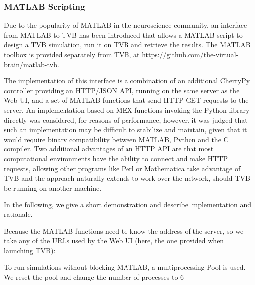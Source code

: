 
\subsubsection{MATLAB Scripting}

Due to the popularity of MATLAB in the neuroscience community, an
interface from MATLAB to TVB has been introduced that allows a MATLAB
script to design a TVB simulation, run it on TVB and retrieve the 
results. The MATLAB toolbox is provided separately from TVB, at
\url{https://github.com/the-virtual-brain/matlab-tvb}.

The implementation of this interface is a combination of an additional
CherryPy controller providing an HTTP/JSON API, running on the same 
server as the Web UI, and a set of MATLAB functions that send HTTP 
GET requests to the server. An implementation based on MEX functions 
invoking the Python library directly was considered, for reasons of 
performance, however, it was judged that such an implementation may be
difficult to stabilize and maintain, given that it would require binary
compatibility between MATLAB, Python and the C compiler. Two additional 
advantages of an HTTP API are that most computational environments have
the ability to connect and make HTTP requests, allowing other programs 
like Perl or Mathematica take advantage of TVB and the approach naturally
extends to work over the network, should TVB be running on another machine.

In the following, we give a short demonstration and 
describe implementation and rationale.



Because the MATLAB functions need to know the address of the server,
so we take any of the URLs used by the Web UI (here, the one provided
when launching TVB):


To run simulations without blocking MATLAB, a multiprocessing Pool
is used. We reset the pool and change the number of processes to 6


